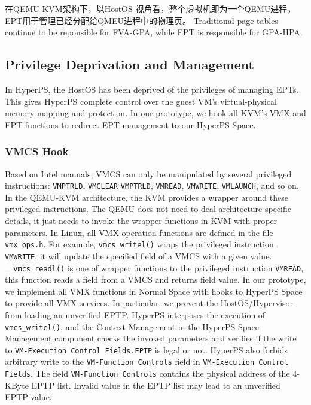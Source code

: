 在QEMU-KVM架构下，以HostOS 视角看，整个虚拟机即为一个QEMU进程，EPT用于管理已经分配给QMEU进程中的物理页。
Traditional page tables continue to be reponsible for FVA-GPA, while EPT is responsible for GPA-HPA.
\fi

\subsection{Privilege Deprivation and Management}%
\label{sub:privilege_deprivation_and_management}


In HyperPS, the HostOS has been deprived of the privileges of managing EPTs. This gives HyperPS complete control over the guest VM's virtual-physical memory mapping and protection. In our prototype, we hook all KVM's VMX and EPT functions to redirect EPT management to our HyperPS Space.

\subsubsection{VMCS Hook}%
\label{ssub:vmcs_hook}


Based on Intel manuals, VMCS can only be manipulated by several privileged instructions: \verb|VMPTRLD|, \verb|VMCLEAR| \verb|VMPTRLD|, \verb|VMREAD|, \verb|VMWRITE|, \verb|VMLAUNCH|, and so on.
In the QEMU-KVM architecture, the KVM provides a wrapper around these privileged instructions. The QEMU does not need to deal architecture specific details, it just needs to invoke the wrapper functions in KVM with proper parameters.
In Linux, all VMX operation functions are defined in the file \verb|vmx_ops.h|. 
For example, \verb|vmcs_writel()| wraps the privileged instruction \verb|VMWRITE|, it will update the specified field of a VMCS with a given value. 
\verb|__vmcs_readl()| is one of wrapper functions to the privileged instruction \verb|VMREAD|, this function reads a field from a VMCS and returns field value. 
In our prototype, we implement all VMX functions in Normal Space with hooks to HyperPS Space to provide all VMX services. 
In particular, we prevent the HostOS/Hypervisor from loading an unverified EPTP. 
HyperPS interposes the execution of \verb|vmcs_writel()|, and the Context Management in the HyperPS Space Management component checks the invoked parameters and verifies if the write to \verb|VM-Execution Control Fields.EPTP| is legal or not. 
HyperPS also forbids arbitrary write to the \verb|VM-Function Controls| field in \verb|VM-Execution Control Fields|.
The field \verb|VM-Function Controls| contains the physical address of the 4-KByte EPTP list. Invalid value in the EPTP list may lead to an unverified EPTP value. 

